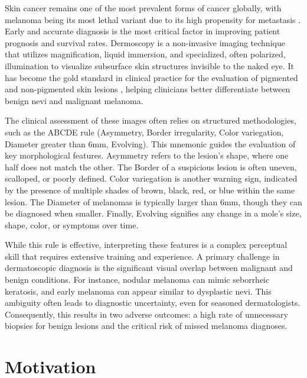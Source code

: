 Skin cancer remains one of the most prevalent forms of cancer globally, with melanoma being its most lethal variant due to its high propensity for metastasis \cite{siegel2020cancer}. Early and accurate diagnosis is the most critical factor in improving patient prognosis and survival rates. Dermoscopy is a non-invasive imaging technique that utilizes magnification, liquid immersion, and specialized, often polarized, illumination to visualize subsurface skin structures invisible to the naked eye. It has become the gold standard in clinical practice for the evaluation of pigmented and non-pigmented skin lesions \cite{zalaudek2006nodular}, helping clinicians better differentiate between benign nevi and malignant melanoma.

The clinical assessment of these images often relies on structured methodologies, such as the ABCDE rule (Asymmetry, Border irregularity, Color variegation, Diameter greater than 6mm, Evolving). This mnemonic guides the evaluation of key morphological features. Asymmetry refers to the lesion's shape, where one half does not match the other. The Border of a suspicious lesion is often uneven, scalloped, or poorly defined. Color variegation is another warning sign, indicated by the presence of multiple shades of brown, black, red, or blue within the same lesion. The Diameter of melanomas is typically larger than 6mm, though they can be diagnosed when smaller. Finally, Evolving signifies any change in a mole's size, shape, color, or symptoms over time.

While this rule is effective, interpreting these features is a complex perceptual skill that requires extensive training and experience. A primary challenge in dermatoscopic diagnosis is the significant visual overlap between malignant and benign conditions. For instance, nodular melanoma can mimic seborrheic keratosis, and early melanoma can appear similar to dysplastic nevi. This ambiguity often leads to diagnostic uncertainty, even for seasoned dermatologists. Consequently, this results in two adverse outcomes: a high rate of unnecessary biopsies for benign lesions and the critical risk of missed melanoma diagnoses.

\section{Motivation}\label{Chapter_1_Motivation}

